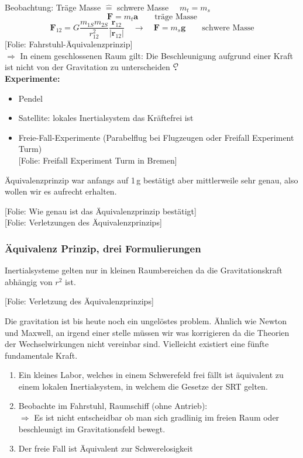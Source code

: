 \documentclass[titlepage,11pt,a4paper,ngerman]{report}
\newcommand{\tx}[1]{\textrm{#1}}
\newcommand{\folie}[1]{\color{gray}[Folie: #1]\color{black}}
\renewcommand{\vec}[1]{\boldsymbol{#1}}
\newcommand{\lcom}[1]{\color{MidnightBlue}#1\color{black}}
\newcommand{\mau}{$\buildrel \mathcal{O} \over{\textbf{.}}$}
\begin{document}
Beobachtung: Träge Masse $ \widehat{=} $ schwere Masse $ \quad m_t = m_s $
\begin{equation*}
\vec{F} = m_t \vec{a} \qquad \tx{träge Masse}
\end{equation*}
\begin{equation*}
\vec{F}_{12} = G \frac{m_{1S} m_{2S}}{r_{12}^2} \frac{\vec{r}_{12}}{|\vec{r}_{12}|} \quad \rightarrow \quad \vec{F} = m_s \vec{g} \qquad \tx{schwere Masse}
\end{equation*}
\folie{Fahrstuhl-Äquivalenzprinzip}\\
$ \Rightarrow $ In einem geschlossenen Raum gilt: Die Beschleunigung aufgrund einer Kraft ist nicht von der Gravitation zu unterscheiden \mau\\
\noindent
\textbf{Experimente:}
\begin{itemize}
	\item Pendel
	\item Satellite: lokales Inertialsystem das Kräftefrei ist
	\item Freie-Fall-Experimente (Parabelflug bei Flugzeugen oder Freifall Experiment Turm) \\
	\folie{Freifall Experiment Turm in Bremen}
\end{itemize}
\lcom{Äquivalenzprinzip war anfangs auf 1\,g bestätigt aber mittlerweile sehr genau, also wollen wir es aufrecht erhalten.}

\folie{Wie genau ist das Äquivalenzprinzip bestätigt}\\
\folie{Verletzungen des Äquivalenzprinzips}

\subsubsection{Äquivalenz Prinzip, drei Formulierungen}
\lcom{Inertialsysteme gelten nur in kleinen Raumbereichen da die Gravitationskraft abhängig von $r^2$ ist.}

\folie{Verletzung des Äquivalenzprinzips}

\lcom{Die gravitation ist bis heute noch ein ungelöstes problem. Ähnlich wie Newton und Maxwell, an irgend einer stelle müssen wir was korrigieren da die Theorien der Wechselwirkungen nicht vereinbar sind. Vielleicht existiert eine fünfte fundamentale Kraft.} 

\begin{enumerate}[1)]
	\item Ein kleines Labor, welches in einem Schwerefeld frei fällt ist äquivalent zu einem lokalen Inertialsystem, in welchem die Gesetze der SRT gelten.
	\item Beobachte im Fahrstuhl, Raumschiff (ohne Antrieb):\\
	$ \Rightarrow $ Es ist nicht entscheidbar ob man sich gradlinig im freien Raum oder beschleunigt im Gravitationsfeld bewegt.
	\item Der freie Fall ist Äquivalent zur Schwerelosigkeit
\end{enumerate}
\end{document}
